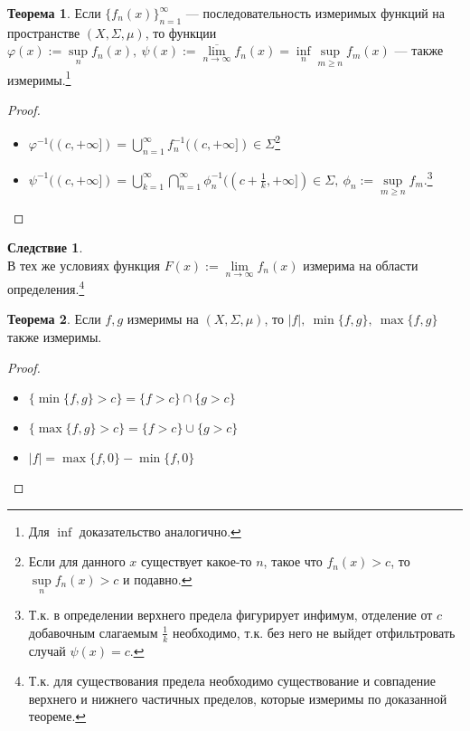 \documentclass[11pt,a4paper]{report}
\theoremstyle{definition}
\theoremstyle{definition}
\newtheorem{theorem}{Теорема}[section]
\newtheorem{corollary}{Следствие}[section]
\theoremstyle{definition}
\begin{document}
	\begin{theorem}
		Если $ \{f_{n}(x)\}_{n=1}^{\infty} $ — последовательность измеримых функций на пространстве $ (X, \Sigma, \mu) $, то функции $ \varphi(x) := \sup\limits_{n}f_{n}(x),\ \psi(x) := \overline{\lim\limits_{n\to\infty}}{f_{n}(x)} = \inf\limits_{n}{\sup\limits_{m \ge n} f_{m}(x)} $ — также измеримы.\footnote{Для $ \inf $ доказательство аналогично.}
	\end{theorem}
	\begin{proof}$  $
		\begin{itemize}
			\item $ \varphi^{-1}((c, +\infty]) = \bigcup\limits_{n=1}^{\infty}{f^{-1}_{n}((c, +\infty])} \in \Sigma $\footnote{Если для данного $ x $ существует какое-то $ n $, такое что $ f_{n}(x) > c $, то $ \sup\limits_{n}f_{n}(x) > c $ и подавно.}
			\item $ \psi^{-1}((c, +\infty]) = \bigcup\limits_{k=1}^{\infty}{ \bigcap\limits_{n=1}^{\infty}{\phi_{n}^{-1}((c + \frac{1}{k}, +\infty]) }} \in \Sigma,\ \phi_{n} := \sup\limits_{m \ge n}{ f_{m}  } $.\footnote{Т.к. в определении верхнего предела фигурирует инфимум, отделение от $ c $ добавочным слагаемым $ \frac{1}{k} $ необходимо, т.к. без него не выйдет отфильтровать случай $ \psi(x) = c $.}
		\end{itemize}
	\end{proof}
	\begin{corollary}$  $\\
		В тех же условиях функция $ F(x) := \lim\limits_{n\to\infty}f_{n}(x) $ измерима на области определения.\footnote{Т.к. для существования предела необходимо существование и совпадение верхнего и нижнего частичных пределов, которые измеримы по доказанной теореме.}
	\end{corollary}
	\begin{theorem}
			Если $ f, g $ измеримы на $ (X, \Sigma, \mu) $, то $ |f|,\ \min \{f, g\},\ \max \{f, g\} $ также измеримы.
	\end{theorem}
	\begin{proof}$  $
		\begin{itemize}
			\item $ \{\min\{f, g\} > c\} = \{f > c\} \cap \{g > c\} $
			\item $ \{\max\{f, g\} > c\} = \{f > c\} \cup \{g > c\} $
			\item $ |f| = \max\{f, 0\} - \min\{f, 0\} $
		\end{itemize}
	\end{proof}
\end{document}

